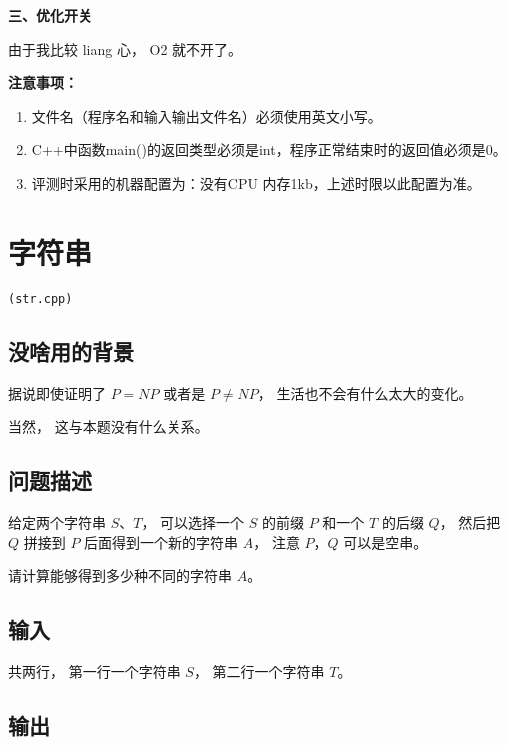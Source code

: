 \documentclass[UTF8]{ctexart}
\begin{document}
\textbf{三、优化开关}
\begin{center}
由于我比较 liang 心， O2 就不开了。
\end{center}

\textbf{注意事项：}
\begin{enumerate}
    \item{文件名（程序名和输入输出文件名）必须使用英文小写。}
    \item{C++中函数main()的返回类型必须是int，程序正常结束时的返回值必须是0。}
    \item{评测时采用的机器配置为：没有CPU 内存1kb，上述时限以此配置为准。}
\end{enumerate}

\newpage
\setcounter{page}{1}
\pagestyle{plain}

\newpage
\section{字符串}
\begin{center}
\tt\large{(str.cpp)}
\end{center}

\subsection{没啥用的背景}

据说即使证明了 $P=NP$ 或者是 $P\neq NP$， 生活也不会有什么太大的变化。

当然， 这与本题没有什么关系。

\subsection{问题描述}

给定两个字符串 $S$、$T$， 可以选择一个 $S$ 的前缀 $P$ 和一个 $T$ 的后缀 $Q$， 然后把 $Q$ 拼接到 $P$ 后面得到一个新的字符串 $A$， 注意 $P$，$Q$ 可以是空串。

请计算能够得到多少种不同的字符串 $A$。

\subsection{输入} 

共两行， 第一行一个字符串 $S$， 第二行一个字符串 $T$。

\subsection{输出}
\end{document}
